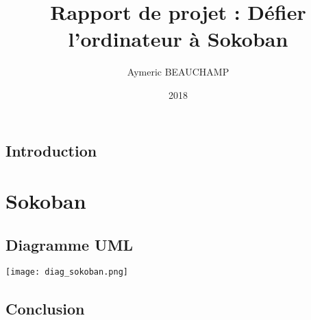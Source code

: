 \documentclass{report} %
\title{Rapport de projet : Défier l'ordinateur à Sokoban}
\author{Aymeric BEAUCHAMP}
\date{2018}
\newcommand{\umlscale}{0.33}
\begin{document}
\maketitle

\tableofcontents

\chapter*{Introduction}

\part{Sokoban}

\chapter{Diagramme UML}

\texttt{[image: diag\_sokoban.png]}

\chapter*{Conclusion}
\end{document}
